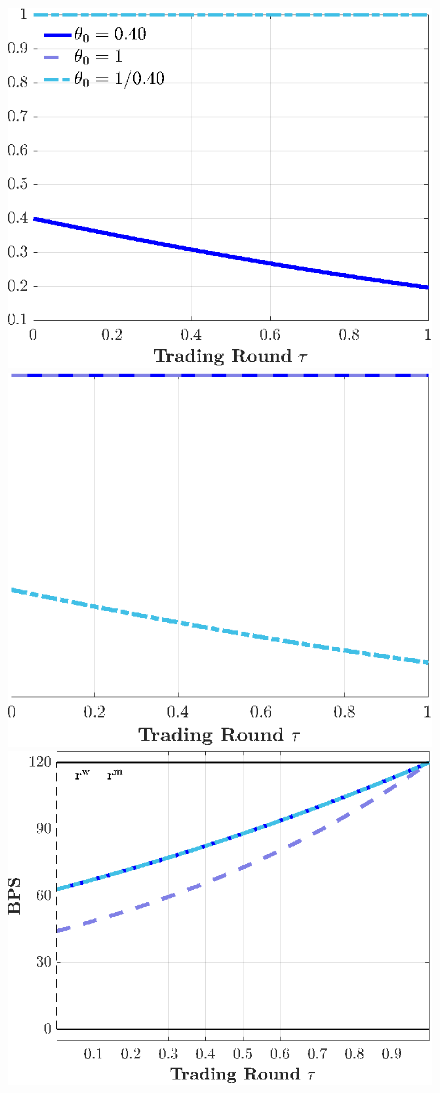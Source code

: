 \documentclass[12pt,american,english,notitlepage]{article}
\begin{document}
 
\begin{figure}[htb]
\begin{center}
 \\[2pt]
\includegraphics[width=0.8\linewidth]{NewCode/Figures/F_l_gammaplus_tau.eps}
\endminipage{}
\\[2pt]
\includegraphics[width=0.78\linewidth]{NewCode/Figures/F_l_gammaminus_tau.eps}
\endminipage{}
\\[2pt]
\includegraphics[width=0.8\linewidth]{NewCode/Figures/F_l_Surplus_tau.eps}

\end{center}
\end{figure}
\end{document}
